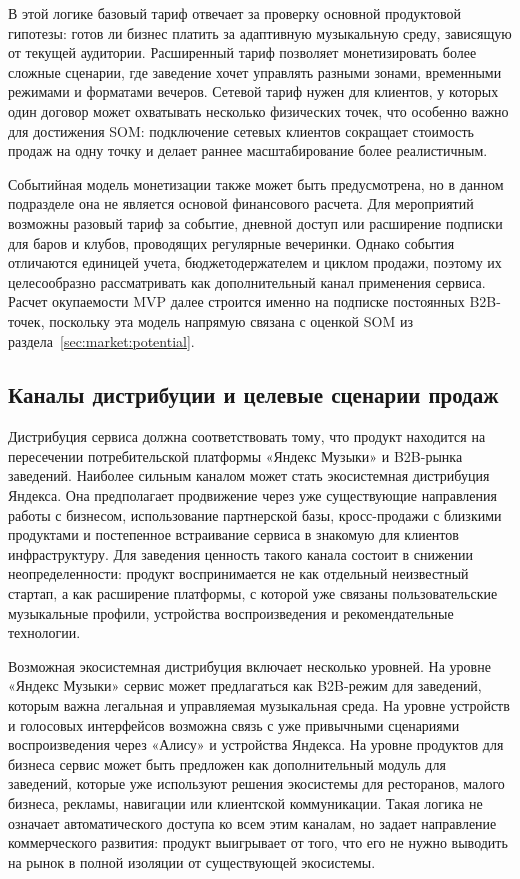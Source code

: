 В этой логике базовый тариф отвечает за проверку основной продуктовой гипотезы: готов ли бизнес платить за адаптивную музыкальную среду, зависящую от текущей аудитории. Расширенный тариф позволяет монетизировать более сложные сценарии, где заведение хочет управлять разными зонами, временными режимами и форматами вечеров. Сетевой тариф нужен для клиентов, у которых один договор может охватывать несколько физических точек, что особенно важно для достижения SOM: подключение сетевых клиентов сокращает стоимость продаж на одну точку и делает раннее масштабирование более реалистичным.

Событийная модель монетизации также может быть предусмотрена, но в данном подразделе она не является основой финансового расчета. Для мероприятий возможны разовый тариф за событие, дневной доступ или расширение подписки для баров и клубов, проводящих регулярные вечеринки. Однако события отличаются единицей учета, бюджетодержателем и циклом продажи, поэтому их целесообразно рассматривать как дополнительный канал применения сервиса. Расчет окупаемости MVP далее строится именно на подписке постоянных B2B-точек, поскольку эта модель напрямую связана с оценкой SOM из раздела~\ref{sec:market:potential}.

\subsection{Каналы дистрибуции и целевые сценарии продаж}
\label{subsec:service:monetization:distribution}

Дистрибуция сервиса должна соответствовать тому, что продукт находится на пересечении потребительской платформы «Яндекс Музыки» и B2B-рынка заведений. Наиболее сильным каналом может стать экосистемная дистрибуция Яндекса. Она предполагает продвижение через уже существующие направления работы с бизнесом, использование партнерской базы, кросс-продажи с близкими продуктами и постепенное встраивание сервиса в знакомую для клиентов инфраструктуру. Для заведения ценность такого канала состоит в снижении неопределенности: продукт воспринимается не как отдельный неизвестный стартап, а как расширение платформы, с которой уже связаны пользовательские музыкальные профили, устройства воспроизведения и рекомендательные технологии.

Возможная экосистемная дистрибуция включает несколько уровней. На уровне «Яндекс Музыки» сервис может предлагаться как B2B-режим для заведений, которым важна легальная и управляемая музыкальная среда. На уровне устройств и голосовых интерфейсов возможна связь с уже привычными сценариями воспроизведения через «Алису» и устройства Яндекса. На уровне продуктов для бизнеса сервис может быть предложен как дополнительный модуль для заведений, которые уже используют решения экосистемы для ресторанов, малого бизнеса, рекламы, навигации или клиентской коммуникации. Такая логика не означает автоматического доступа ко всем этим каналам, но задает направление коммерческого развития: продукт выигрывает от того, что его не нужно выводить на рынок в полной изоляции от существующей экосистемы.

